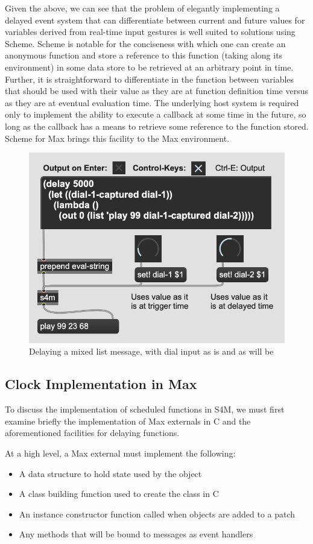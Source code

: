\documentclass[acmsmall]{acmart}
\begin{document}
Given the above, we can see that the problem of elegantly implementing 
a delayed event system that can differentiate between current and future values
for variables derived from real-time input gestures is well suited to solutions 
using Scheme. Scheme is notable for the conciseness with which one can create an anonymous function
and store a reference to this function (taking along its environment) in some data
store to be retrieved at an arbitrary point in time. Further, it is straightforward
to differentiate in the function between variables that should
be used with their value as they are at function definition time versus
as they are at eventual evaluation time. The underlying host system is required only to 
implement the ability to execute a callback at some time in the future, so long as 
the callback has a means to retrieve some reference to the function stored.
Scheme for Max brings this facility to the Max environment.

\begin{figure}[H]
  \centering
  \includegraphics[width=.5\linewidth]{fig-6-s4m-delay}
  \caption{Delaying a mixed list message, with dial input as is and as will be}
\end{figure}

\subsection{Clock Implementation in Max}

To discuss the implementation of scheduled functions in S4M, we must first examine
briefly the implementation of Max externals in C and the aforementioned 
facilities for delaying functions.

At a high level, a Max external must implement the following:

\begin{itemize}
\item A data structure to hold state used by the object
\item A class building function used to create the class in C
\item An instance constructor function called when objects are added to a patch
\item Any methods that will be bound to messages as event handlers
\end{itemize}
\end{document}

